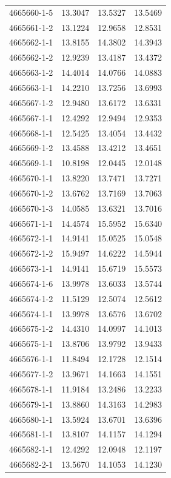 \begin{longtable}{lrrr}
4665660-1-5 & 13.3047 & 13.5327 & 13.5469 \\
4665661-1-2 & 13.1224 & 12.9658 & 12.8531 \\
4665662-1-1 & 13.8155 & 14.3802 & 14.3943 \\
4665662-1-2 & 12.9239 & 13.4187 & 13.4372 \\
4665663-1-2 & 14.4014 & 14.0766 & 14.0883 \\
4665663-1-1 & 14.2210 & 13.7256 & 13.6993 \\
4665667-1-2 & 12.9480 & 13.6172 & 13.6331 \\
4665667-1-1 & 12.4292 & 12.9494 & 12.9353 \\
4665668-1-1 & 12.5425 & 13.4054 & 13.4432 \\
4665669-1-2 & 13.4588 & 13.4212 & 13.4651 \\
4665669-1-1 & 10.8198 & 12.0445 & 12.0148 \\
4665670-1-1 & 13.8220 & 13.7471 & 13.7271 \\
4665670-1-2 & 13.6762 & 13.7169 & 13.7063 \\
4665670-1-3 & 14.0585 & 13.6321 & 13.7016 \\
4665671-1-1 & 14.4574 & 15.5952 & 15.6340 \\
4665672-1-1 & 14.9141 & 15.0525 & 15.0548 \\
4665672-1-2 & 15.9497 & 14.6222 & 14.5944 \\
4665673-1-1 & 14.9141 & 15.6719 & 15.5573 \\
4665674-1-6 & 13.9978 & 13.6033 & 13.5744 \\
4665674-1-2 & 11.5129 & 12.5074 & 12.5612 \\
4665674-1-1 & 13.9978 & 13.6576 & 13.6702 \\
4665675-1-2 & 14.4310 & 14.0997 & 14.1013 \\
4665675-1-1 & 13.8706 & 13.9792 & 13.9433 \\
4665676-1-1 & 11.8494 & 12.1728 & 12.1514 \\
4665677-1-2 & 13.9671 & 14.1663 & 14.1551 \\
4665678-1-1 & 11.9184 & 13.2486 & 13.2233 \\
4665679-1-1 & 13.8860 & 14.3163 & 14.2983 \\
4665680-1-1 & 13.5924 & 13.6701 & 13.6396 \\
4665681-1-1 & 13.8107 & 14.1157 & 14.1294 \\
4665682-1-1 & 12.4292 & 12.0948 & 12.1197 \\
4665682-2-1 & 13.5670 & 14.1053 & 14.1230 \\

\end{longtable}
